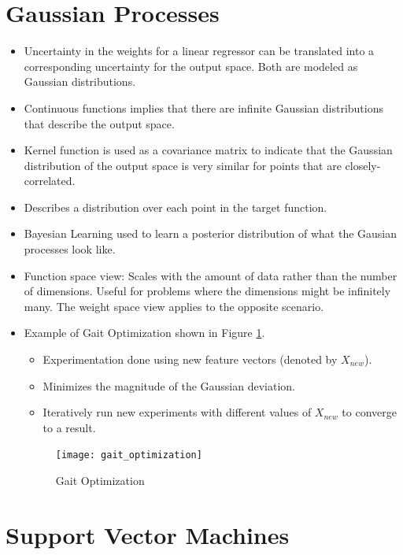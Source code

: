 \documentclass[parskip=half]{scrartcl}
\begin{document}
\section{Gaussian Processes} %
\label{sec:gaussian_processes}
\begin{itemize}
    \item
    Uncertainty in the weights for a linear regressor can be translated into a corresponding uncertainty for the output space. Both are modeled as Gaussian distributions.
    \item
    Continuous functions implies that there are infinite Gaussian distributions that describe the output space.
    \item
    Kernel function is used as a covariance matrix to indicate that the Gaussian distribution of the output space is very similar for points that are closely-correlated.
    \item 
    Describes a distribution over each point in the target function. 
    \item 
    Bayesian Learning used to learn a posterior distribution of what the Gausian processes look like.
    \item 
    Function space view: Scales with the amount of data rather than the number of dimensions. Useful for problems where the dimensions might be infinitely many. The weight space view applies to the opposite scenario.
    \item 
    Example of Gait Optimization shown in Figure \ref{fig:gait_optimization}.
    \begin{itemize}
        \item 
        Experimentation done using new feature vectors (denoted by $X_{new}$).
        \item 
        Minimizes the magnitude of the Gaussian deviation.
        \item 
        Iteratively run new experiments with different values of $X_{new}$ to converge to a result.
    \end{itemize}
    \begin{figure}[th]
    \centering
    \texttt{[image: gait\_optimization]}
    \caption{Gait Optimization}
    \label{fig:gait_optimization}
    \end{figure}
\end{itemize}



\newpage


\section{Support Vector Machines} %
\label{sec:support_vector_machines}
\end{document}
